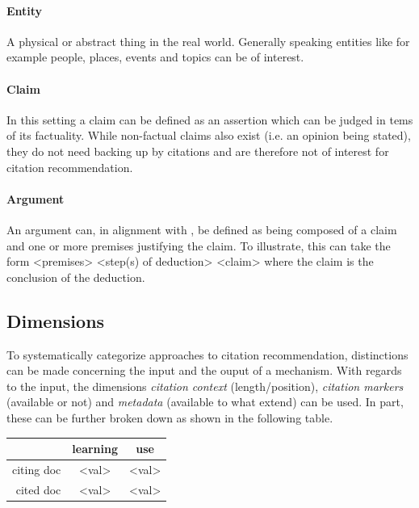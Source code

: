 \documentclass{proseminar}
\begin{document}
\paragraph{Entity}
A physical or abstract thing in the real world. Generally speaking entities like for example people, places, events and topics can be of interest.

\paragraph{Claim}
In this setting a claim can be defined as an assertion which can be judged in tems of its factuality. While non-factual claims also exist (i.e. an opinion being stated), they do not need backing up by citations and are therefore not of interest for citation recommendation.

\paragraph{Argument}
An argument can, in alignment with \cite{Besnard2008}, be defined as being composed of a claim and one or more premises justifying the claim. To illustrate, this can take the form <premises> <step(s) of deduction> <claim> where the claim is the conclusion of the deduction.

\subsection{Dimensions}\label{dimensions}
To systematically categorize approaches to citation recommendation, distinctions can be made concerning the input and the ouput of a mechanism. With regards to the input, the dimensions \emph{citation context} (length/position), \emph{citation markers} (available or not) and \emph{metadata} (available to what extend) can be used. In part, these can be further broken down as shown in the following table.

\begin{table}[!htbp]
\centering
\begin{tabular}{r|c|c}
&learning&use\\ \hline
citing doc & <val> & <val>\\ \hline
cited doc & <val> & <val>\\
\end{tabular}
\end{table}
\end{document}

